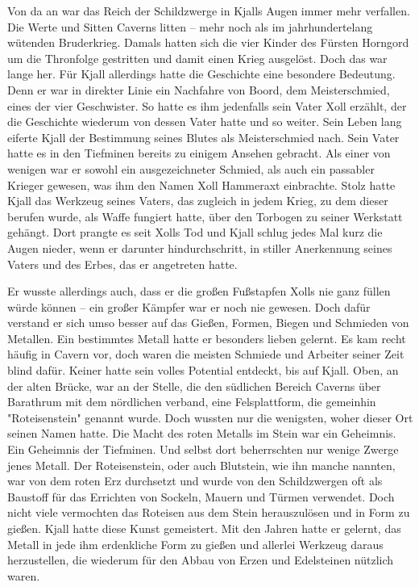 \documentclass[10pt, a4paper, oneside]{book}
\begin{document}
\begin{multicols}{2}
Von da an war das Reich der Schildzwerge in Kjalls Augen immer mehr verfallen. Die Werte und Sitten Caverns litten – mehr noch als im jahrhundertelang wütenden Bruderkrieg. Damals hatten sich die vier Kinder des Fürsten Horngord um die Thronfolge gestritten und damit einen Krieg ausgelöst. Doch das war lange her. Für Kjall allerdings hatte die Geschichte eine besondere Bedeutung. Denn er war in direkter Linie ein Nachfahre von Boord, dem Meisterschmied, eines der vier Geschwister. So hatte es ihm jedenfalls sein Vater Xoll erzählt, der die Geschichte wiederum von dessen Vater hatte und so weiter. Sein Leben lang eiferte Kjall der Bestimmung seines Blutes als Meisterschmied nach. Sein Vater hatte es in den Tiefminen bereits zu einigem Ansehen gebracht. Als einer von wenigen war er sowohl ein ausgezeichneter Schmied, als auch ein passabler Krieger gewesen, was ihm den Namen Xoll Hammeraxt einbrachte. Stolz hatte Kjall das Werkzeug seines Vaters, das zugleich in jedem Krieg, zu dem dieser berufen wurde, als Waffe fungiert hatte, über den Torbogen zu seiner Werkstatt gehängt. Dort prangte es seit Xolls Tod und Kjall schlug jedes Mal kurz die Augen nieder, wenn er darunter hindurchschritt, in stiller Anerkennung seines Vaters und des Erbes, das er angetreten hatte.\bigskip

Er wusste allerdings auch, dass er die großen Fußstapfen Xolls nie ganz füllen würde können – ein großer Kämpfer war er noch nie gewesen. Doch dafür verstand er sich umso besser auf das Gießen, Formen, Biegen und Schmieden von Metallen. Ein bestimmtes Metall hatte er besonders lieben gelernt. Es kam recht häufig in Cavern vor, doch waren die meisten Schmiede und Arbeiter seiner Zeit blind dafür. Keiner hatte sein volles Potential entdeckt, bis auf Kjall. Oben, an der alten Brücke, war an der Stelle, die den südlichen Bereich Caverns über Barathrum mit dem nördlichen verband, eine Felsplattform, die gemeinhin "Roteisenstein" genannt wurde. Doch wussten nur die wenigsten, woher dieser Ort seinen Namen hatte. Die Macht des roten Metalls im Stein war ein Geheimnis. Ein Geheimnis der Tiefminen. Und selbst dort beherrschten nur wenige Zwerge jenes Metall. Der Roteisenstein, oder auch Blutstein, wie ihn manche nannten, war von dem roten Erz durchsetzt und wurde von den Schildzwergen oft als Baustoff für das Errichten von Sockeln, Mauern und Türmen verwendet. Doch nicht viele vermochten das Roteisen aus dem Stein herauszulösen und in Form zu gießen. Kjall hatte diese Kunst gemeistert. Mit den Jahren hatte er gelernt, das Metall in jede ihm erdenkliche Form zu gießen und allerlei Werkzeug daraus herzustellen, die wiederum für den Abbau von Erzen und Edelsteinen nützlich waren.\bigskip


\end{multicols}
\end{document}
